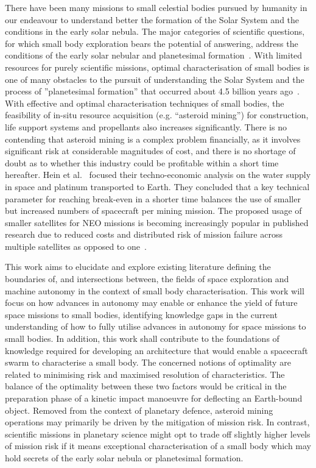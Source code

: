 There have been many missions to small celestial bodies pursued by humanity in our endeavour to understand better the formation of the Solar System and the conditions in the early solar nebula. The major categories of scientific questions, for which small body exploration bears the potential of answering, address the conditions of the early solar nebular and planetesimal formation~\cite{Davidsson2021}. With limited resources for purely scientific missions, optimal characterisation of small bodies is one of many obstacles to the pursuit of understanding the Solar System and the process of ''planetesimal formation'' that occurred about 4.5 billion years ago~\cite{Klahr2015}. With effective and optimal characterisation techniques of small bodies, the feasibility of in-situ resource acquisition (e.g. ``asteroid mining'') for construction, life support systems and propellants also increases significantly. There is no contending that asteroid mining is a complex problem financially, as it involves significant risk at considerable magnitudes of cost, and there is no shortage of doubt as to whether this industry could be profitable within a short time hereafter. Hein et al.~\cite{Hein2020} focused their techno-economic analysis on the water supply in space and platinum transported to Earth. They concluded that a key technical parameter for reaching break-even in a shorter time balances the use of smaller but increased numbers of spacecraft per mining mission. The proposed usage of smaller satellites for \gls{NEO} missions is becoming increasingly popular in published research due to reduced costs and distributed risk of mission failure across multiple satellites as opposed to one~\cite{Wells2006, Laurin2008, Scott2013, Yu2014}. 

This work aims to elucidate and explore existing literature defining the boundaries of, and intersections between, the fields of space exploration and machine autonomy in the context of small body characterisation. This work will focus on how advances in autonomy may enable or enhance the yield of future space missions to small bodies, identifying knowledge gaps in the current understanding of how to fully utilise advances in autonomy for space missions to small bodies. In addition, this work shall contribute to the foundations of knowledge required for developing an architecture that would enable a spacecraft swarm to characterise a small body. The concerned notions of optimality are related to minimising risk and maximised resolution of characteristics. The balance of the optimality between these two factors would be critical in the preparation phase of a kinetic impact manoeuvre for deflecting an Earth-bound object. Removed from the context of planetary defence, asteroid mining operations may primarily be driven by the mitigation of mission risk. In contrast, scientific missions in planetary science might opt to trade off slightly higher levels of mission risk if it means exceptional characterisation of a small body which may hold secrets of the early solar nebula or planetesimal formation.

